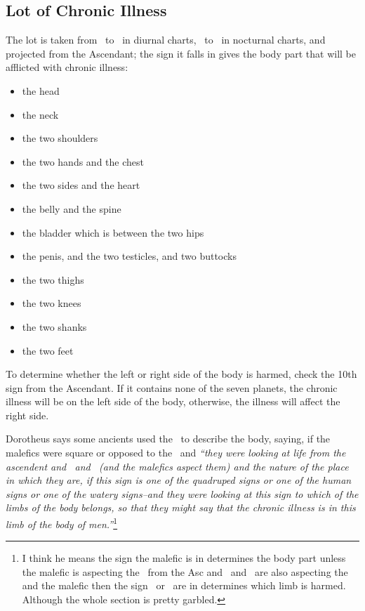 \subsection{Lot of Chronic Illness}
The  lot is taken from \Saturn\, to \Mars\, in diurnal charts, \Mars\, to \Saturn\, in nocturnal charts, and projected from the Ascendant; the sign it falls in gives the body part that will be afflicted with chronic illness:
\begin{itemize}[topsep=0em,itemsep=0em]
\item[\Aries]  the head
\item[\Taurus] the neck
\item[\Gemini] the two shoulders
\item[\Cancer] the two hands and the chest
\item[\Leo] the two sides and the heart
\item[\Virgo] the belly and the spine
\item[\Libra] the bladder which is between the two hips
\item[\Scorpio] the penis, and the two testicles, and two buttocks
\item[\Sagittarius] the two thighs
\item[\Capricorn] the two knees
\item[\Aquarius] the two shanks
\item[\Pisces] the two feet
\end{itemize}

To  determine whether the left or right side of the body is harmed, check the 10th sign from the Ascendant. If it contains none of the seven planets, the chronic illness will be on the left side of the body, otherwise, the illness will affect the right side.

Dorotheus  says some ancients used the \Moon\, to describe the body, saying, if the malefics were square or opposed to the \Moon\, and \textsl{``they were looking at life from the ascendent and \Venus\, and \Mercury\, (and the malefics aspect them) and the nature of the place in which they are, if this sign is one of the quadruped signs or one of the human signs or one of the watery signs--and they were looking at this sign to which of the limbs of the body belongs, so that they might say that the chronic illness is in this limb of the body of men.''}\footnote{I think he means the sign the malefic is in determines the body part unless the malefic is aspecting the \Moon\, from the Asc and \Venus\, and \Mercury\, are also aspecting the \Moon\, and the malefic then the sign \Venus\, or \Mercury\, are in determines which limb is harmed. Although the whole section is pretty garbled.}


